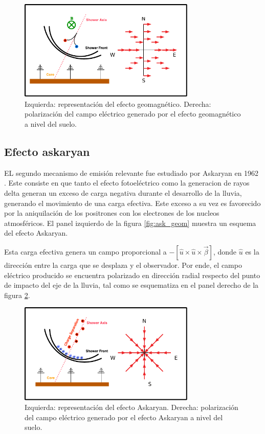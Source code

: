 	\begin{figure}[ht!]
		\centering
		\includegraphics[width=0.75\textwidth]{fig/EASRadio/geom_sketch}
		\caption{\label{fig:geom_sketch} Izquierda: representaci\'on del efecto geomagnético.
		Derecha: polarización del campo eléctrico generado por el efecto geomagnético a nivel del suelo.}
	\end{figure}
	
	\subsection{Efecto askaryan}
	
	EL segundo mecanismo de emisión relevante fue estudiado por Askaryan en 1962 \cite{askaryan1962}. Este consiste en que tanto el efecto fotoel\'ectrico como la generacion de rayos delta generan un exceso de carga negativa durante el desarrollo de la lluvia, generando el movimiento de una carga efectiva.
	Este exceso a su vez es favorecido por la aniquilaci\'on de los positrones con los electrones de los nucleos atmosf\'ericos. 
	El panel izquierdo de la figura \ref{fig:ask_geom} muestra un esquema del efecto Askaryan.
	
	Esta carga efectiva genera un campo proporcional a $-\left[\hat u \times \hat u \times \vec\beta\right]$, donde $\hat u$ es la direcci\'on entre la carga que se desplaza y el observador.
	Por ende, el campo eléctrico producido se encuentra polarizado en dirección radial respecto del punto de impacto del eje de la lluvia, tal como se esquematiza en el panel derecho de la figura \ref{fig:ask_sketch}.
	
	\begin{figure}[ht!]
		\centering
		\includegraphics[width=0.75\textwidth]{fig/EASRadio/ask_sketch}
		\caption{\label{fig:ask_sketch} Izquierda: representaci\'on del efecto Askaryan.
		Derecha: polarización del campo eléctrico generado por el efecto Askaryan a nivel del suelo.}
	\end{figure}
	
